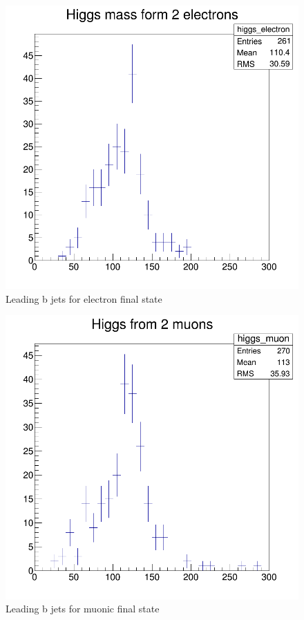\documentclass[12pt]{article}
\begin{document}
			  \begin{figure}[h]
			 	\centering
			 	\includegraphics[scale=.31]{electronic.png}
			 	\caption{Leading b jets for electron final state}
			 \end{figure}
			  \begin{figure}[h]
			 	\centering
			 	\includegraphics[scale=.31]{muonic.png}
			 	\caption{Leading b jets for muonic final state}
			 \end{figure}
\end{document}
